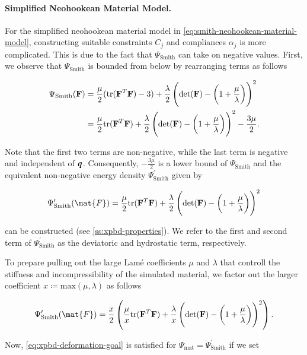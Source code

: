 \paragraph{Simplified Neohookean Material Model.}
For the simplified neohookean material model in \autoref{eq:smith-neohookean-material-model}, constructing suitable constraints 
$C_j$ and compliances $\alpha_j$ is more complicated. This is due to the fact that $\Psi_{\text{Smith}}$ can take on 
negative values. First, we observe that $\Psi_{\text{Smith}}$ is bounded from below by rearranging terms as follows

\begin{align*}
    \Psi_{\text{Smith}}(\mathbf{F}) &= \frac{\mu}{2}(\text{tr}(\mathbf{F}^T\mathbf{F}) - 3) + \frac{\lambda}{2}\left(\text{det}(\mathbf{F}) - 
    \left(1 + \frac{\mu}{\lambda}\right)\right)^2\\
                                  &= \frac{\mu}{2}\text{tr}(\mathbf{F}^T\mathbf{F}) + \frac{\lambda}{2}\left(\text{det}(\mathbf{F}) - 
                                  \left(1 + \frac{\mu}{\lambda}\right)\right)^2 - \frac{3\mu}{2}.
\end{align*}

\noindent Note that the first two terms are non-negative, while the last term is negative and independent of 
$\bm{q}$. Consequently, $-\frac{3\mu}{2}$ is a lower bound of $\Psi_{\text{Smith}}$ and the equivalent 
non-negative energy density $\Psi^\prime_{\text{Smith}}$ given by

\[
    \Psi^\prime_{\text{Smith}}(\mat{F}) = \frac{\mu}{2}\text{tr}(\matm{F}^T\matm{F})     
    + \frac{\lambda}{2}\left(\text{det}(\matm{F}) - \left(1 + \frac{\mu}{\lambda}\right)\right)^2
\]

\noindent can be constructed (see \cref{ss:xpbd-properties}). We refer to the first and second term of 
$\Psi^\prime_{\text{Smith}}$ as the deviatoric and hydrostatic term, respectively.

To prepare pulling out the large Lamé coefficients $\mu$ and $\lambda$ that 
controll the stiffness and incompressibility of the simulated material, we factor out the larger coefficient 
$x \coloneqq \text{max}(\mu, \lambda)$ as follows

\[
    \Psi^\prime_{\text{Smith}}(\mat{F}) = \frac{x}{2} \left(\frac{\mu}{x}\text{tr}(\matm{F}^T\matm{F})     
    + \frac{\lambda}{x}\left(\text{det}(\matm{F}) - \left(1 + \frac{\mu}{\lambda}\right)\right)^2\right).
\]

\noindent Now, \autoref{eq:xpbd-deformation-goal} is satisfied for $\Psi_{\text{mat}} = \Psi^\prime_{\text{Smith}}$ if 
we set

